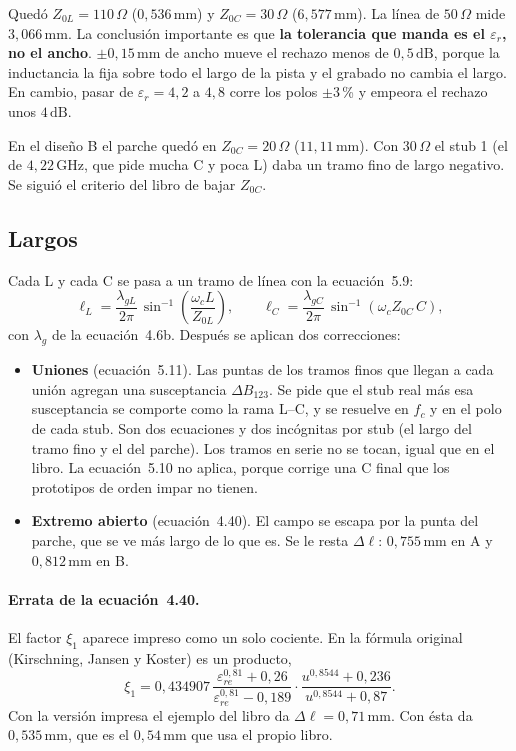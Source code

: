 Quedó $Z_{0L} = 110\,\Omega$ ($0{,}536\,\text{mm}$) y $Z_{0C} = 30\,\Omega$
($6{,}577\,\text{mm}$). La línea de $50\,\Omega$ mide $3{,}066\,\text{mm}$.
La conclusión importante es que \textbf{la tolerancia que manda es el
$\varepsilon_r$, no el ancho}. $\pm 0{,}15\,\text{mm}$ de ancho mueve el
rechazo menos de $0{,}5\,\text{dB}$, porque la inductancia la fija sobre todo
el largo de la pista y el grabado no cambia el largo. En cambio, pasar de
$\varepsilon_r = 4{,}2$ a $4{,}8$ corre los polos $\pm 3$\,\% y empeora el
rechazo unos $4\,\text{dB}$.

En el diseño B el parche quedó en $Z_{0C} = 20\,\Omega$
($11{,}11\,\text{mm}$). Con $30\,\Omega$ el stub 1 (el de $4{,}22\,\text{GHz}$,
que pide mucha C y poca L) daba un tramo fino de largo negativo. Se siguió el
criterio del libro de bajar $Z_{0C}$.

\subsection{Largos}

Cada L y cada C se pasa a un tramo de línea con la ecuación~5.9:
\begin{equation}
  \ell_L = \frac{\lambda_{gL}}{2\pi}\,\sin^{-1}\!\left(\frac{\omega_c L}{Z_{0L}}\right),
  \qquad
  \ell_C = \frac{\lambda_{gC}}{2\pi}\,\sin^{-1}\!\left(\omega_c Z_{0C}\, C\right),
\end{equation}
con $\lambda_g$ de la ecuación~4.6b. Después se aplican dos correcciones:
\begin{itemize}
  \item \textbf{Uniones} (ecuación~5.11). Las puntas de los tramos finos que
    llegan a cada unión agregan una susceptancia $\Delta B_{123}$. Se pide que
    el stub real más esa susceptancia se comporte como la rama L--C, y se
    resuelve en $f_c$ y en el polo de cada stub. Son dos ecuaciones y dos
    incógnitas por stub (el largo del tramo fino y el del parche). Los tramos
    en serie no se tocan, igual que en el libro. La ecuación~5.10 no aplica,
    porque corrige una C final que los prototipos de orden impar no tienen.
  \item \textbf{Extremo abierto} (ecuación~4.40). El campo se escapa por la
    punta del parche, que se ve más largo de lo que es. Se le resta $\Delta
    \ell$: $0{,}755\,\text{mm}$ en A y $0{,}812\,\text{mm}$ en B.
\end{itemize}

\paragraph{Errata de la ecuación~4.40.} El factor $\xi_1$ aparece impreso como
un solo cociente. En la fórmula original (Kirschning, Jansen y Koster) es un
producto,
\begin{equation*}
  \xi_1 = 0{,}434907\,
  \frac{\varepsilon_{re}^{0{,}81} + 0{,}26}{\varepsilon_{re}^{0{,}81} - 0{,}189}
  \cdot
  \frac{u^{0{,}8544} + 0{,}236}{u^{0{,}8544} + 0{,}87}.
\end{equation*}
Con la versión impresa el ejemplo del libro da $\Delta\ell = 0{,}71\,\text{mm}$.
Con ésta da $0{,}535\,\text{mm}$, que es el $0{,}54\,\text{mm}$ que usa el
propio libro.

